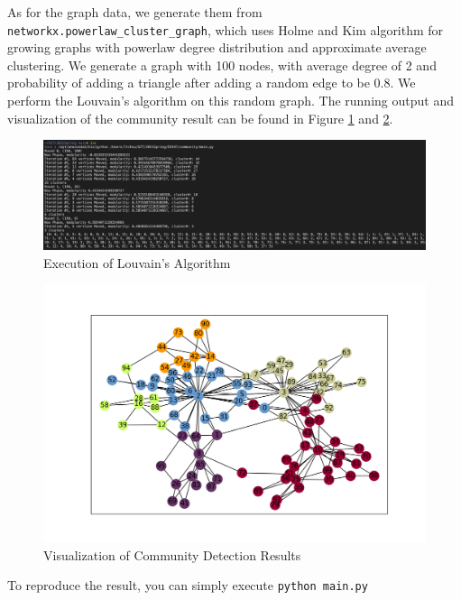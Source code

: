 As for the graph data, we generate them from \texttt{networkx.powerlaw\_cluster\_graph}, which uses Holme and Kim algorithm for growing graphs with powerlaw degree distribution and approximate average clustering. We generate a graph with 100 nodes, with average degree of 2 and probability of adding a triangle after adding a random edge to be 0.8. We perform the Louvain's algorithm on this random graph. The running output and visualization of the community result can be found in Figure \ref{fig:code} and \ref{fig:community}.


\begin{figure}[hb]
    \begin{center}
    \includegraphics[width=12cm]{img/code.png}
    \caption{Execution of Louvain's Algorithm}
    \label{fig:code}
    \end{center}
  \end{figure}

\begin{figure}[hb]
  \begin{center}
  \includegraphics[width=12cm]{img/community.png}
  \caption{Visualization of Community Detection Results}
  \label{fig:community}
  \end{center}
\end{figure}

To reproduce the result, you can simply execute \texttt{python main.py}


